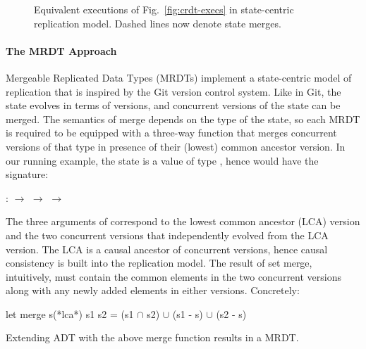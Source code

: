 \begin{figure}[ht]
\begin{subfigure}[t]{0.44\columnwidth}
    \caption{}
    \label{fig:mrdt-exec-2}
  \end{subfigure}
\caption{Equivalent executions of Fig.~\ref{fig:crdt-execs} in
state-centric replication model. Dashed lines now denote state merges.}
\label{fig:mrdt-execs}
\end{figure}

\noindent\paragraph{The MRDT Approach} Mergeable Replicated Data Types
(MRDTs) implement a state-centric model of replication that is
inspired by the Git version control system. Like in Git, the state
evolves in terms of versions, and concurrent versions of the state can
be merged. The semantics of merge depends on the type of the state, so
each MRDT is required to be equipped with a three-way 
function that merges concurrent versions of that type in presence of
their (lowest) common ancestor version. In our running example, the
state is a value of type , hence  would
have the signature:
\begin{center}
 :  $\rightarrow$  $\rightarrow$ 
$\rightarrow$ 
\end{center}
The three arguments of  correspond to the lowest common
ancestor (LCA) version and the two concurrent versions that
independently evolved from the LCA version. The LCA is a causal
ancestor of concurrent versions, hence causal consistency is built
into the replication model. The result of set merge, intuitively, must
contain the common elements in the two concurrent versions along with
any newly added elements in either versions. Concretely:
\begin{ocaml}
  let merge s(*lca*) s1 s2 = 
              (s1 $\cap$ s2) $\cup$ (s1 - s) $\cup$ (s2 - s)
\end{ocaml}
Extending  ADT with the above merge function results in a
 MRDT.

